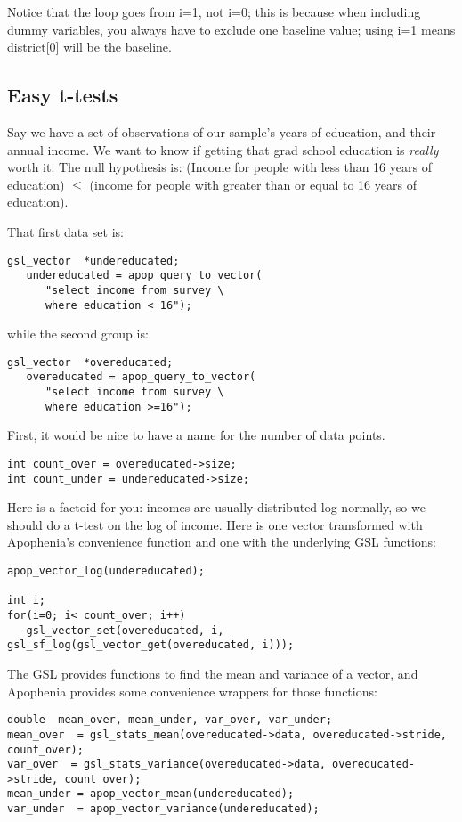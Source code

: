Notice that the  loop goes from i=1, not i=0; this is because when
including dummy variables, you always have to exclude one baseline
value; using i=1 means district[0] will be the baseline.

\subsection{Easy t-tests}
Say we have a set of observations of our sample's years of education,
and their annual income. We want to know if getting that grad school
education is {\it really} worth it. The null hypothesis is: (Income for
people with less than 16 years of education) $\leq$ (income for people
with greater than or equal to 16 years of education).

That first data set is:
\begin{lstlisting}
gsl_vector	*undereducated;
   undereducated = apop_query_to_vector(
      "select income from survey \
      where education < 16");
\end{lstlisting}
while the second group is:
\begin{lstlisting}
gsl_vector	*overeducated;
   overeducated = apop_query_to_vector(
      "select income from survey \
      where education >=16");
\end{lstlisting}

First, it would be nice to have a name for the number of data points.
\begin{lstlisting}
int count_over = overeducated->size;
int count_under = undereducated->size;
\end{lstlisting}

Here is a factoid for you: incomes are usually distributed log-normally, so we should do a t-test on the
log of income. Here is one  vector transformed with Apophenia's convenience function and one with the underlying GSL functions: 
\begin{lstlisting}
apop_vector_log(undereducated);

int i;
for(i=0; i< count_over; i++)
   gsl_vector_set(overeducated, i, gsl_sf_log(gsl_vector_get(overeducated, i)));
\end{lstlisting}

The GSL 
provides functions to find the mean and variance of a vector, and 
Apophenia provides some convenience wrappers for those functions:

\ns{6}
\begin{lstlisting}
double	mean_over, mean_under, var_over, var_under;
mean_over  = gsl_stats_mean(overeducated->data, overeducated->stride,
count_over);
var_over  = gsl_stats_variance(overeducated->data, overeducated->stride, count_over);
mean_under = apop_vector_mean(undereducated);
var_under  = apop_vector_variance(undereducated);
\end{lstlisting}

